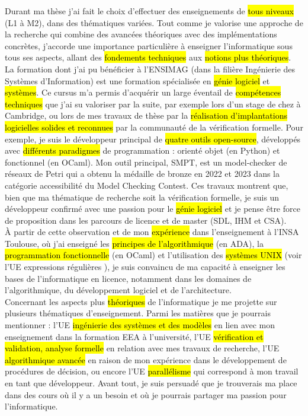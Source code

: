 \label{sec:projet_enseignement}
\vspace{10pt}

Durant ma thèse j'ai fait le choix d'effectuer des enseignements de \hl{tous
niveaux} (L1 à M2), dans des thématiques variées. Tout comme je valorise une
approche de la recherche qui combine des avancées théoriques avec des
implémentations concrètes, j'accorde une importance particulière à enseigner
l'informatique sous tous ses aspects, allant des \hl{fondements techniques} aux
\hl{notions plus théoriques}.\\

La formation dont j'ai pu bénéficier à l'ENSIMAG (dans la filière Ingénierie des
Systèmes d'Information) est une formation spécialisée en \hl{génie logiciel} et
\hl{systèmes}. Ce cursus m'a permis d'acquérir un large éventail de
\hl{compétences techniques} que j'ai su valoriser par la suite, par exemple lors
d'un stage de  chez  à Cambridge,
ou lors de mes travaux de thèse par la \hl{réalisation d'implantations
logicielles solides et reconnues} par la communauté de la vérification formelle.
Pour exemple, je suis le développeur principal de \hl{quatre outils
open-source}, développés avec \hl{différents paradigmes} de programmation :
orienté objet (en Python) et fonctionnel (en OCaml). Mon outil
principal, \textsf{SMPT}, est un model-checker de réseaux de Petri qui a obtenu
la médaille de bronze en 2022 et 2023 dans la catégorie \og accessibilité \fg du
Model Checking Contest. Ces travaux montrent que, bien que ma thématique de
recherche soit la vérification formelle, je suis un développeur confirmé avec
une passion pour le \hl{génie logiciel} et je pense être force de proposition
dans les parcours de licence et de master (SDL, IHM et CSA).\\

À partir de cette observation et de mon \hl{expérience} dans l'enseignement à
l'INSA Toulouse, où j'ai enseigné les \hl{principes de l'algorithmique} (en
ADA), la \hl{programmation fonctionnelle} (en OCaml) et l'utilisation des
\hl{systèmes UNIX} (voir l'UE \og expressions régulières \fg), je suis convaincu
de ma capacité à enseigner les bases de l'informatique en licence, notamment
dans les domaines de l'algorithmique, du développement logiciel et de
l'architecture.\\

Concernant les aspects plus \hl{théoriques} de l'informatique je me projette sur
plusieurs thématiques d'enseignement. Parmi les matières que je pourrais
mentionner : l'UE \og \hl{ingénierie des systèmes et des modèles} \fg en lien
avec mon enseignement dans la formation EEA à l'université, l'UE \og
\hl{vérification et validation, analyse formelle} \fg en relation avec mes
travaux de recherche, l'UE \og \hl{algorithmique avancée} \fg en raison de mon
expérience dans le développement de procédures de décision, ou encore l'UE \og
\hl{parallélisme} \fg qui correspond à mon travail en tant que développeur.
Avant tout, je suis persuadé que je trouverais ma place dans des cours où il y a
un besoin et où je pourrais partager ma passion pour l'informatique.\\


